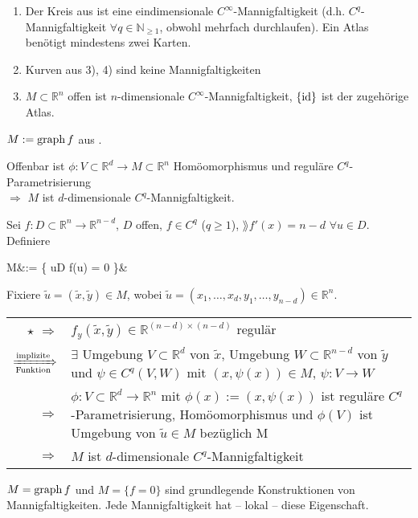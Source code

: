 \begin{example}
	\begin{enumerate}[label={\arabic*)}]
		\item Der Kreis aus  ist eine eindimensionale $C^{\infty}$-Mannigfaltigkeit (d.h. $C^q$-Mannigfaltigkeit $\forall q \in \mathbb{N}_{\ge 1}$, obwohl mehrfach durchlaufen). Ein Atlas benötigt mindestens zwei Karten.
		\item Kurven aus  3), 4) sind keine Mannigfaltigkeiten
		\item $M\subset \mathbb{R}^n$ offen ist $n$-dimensionale $C^\infty$-Mannigfaltigkeit, $\{ \operatorname{id} \}$ ist der zugehörige Atlas.
	\end{enumerate}
\end{example}

\begin{example}
	$M:= \operatorname{graph} f$ aus .
	
	Offenbar ist $\phi\!: V\subset \mathbb{R}^d\to M\subset \mathbb{R}^n$ Homöomorphismus und reguläre $C^q$-Parametrisierung\\
	 $\Rightarrow$ $M$ ist $d$-dimensionale $C^q$-Mannigfaltigkeit.
\end{example}

\begin{example}
	Sei $f\!:D\subset \mathbb{R}^n\to \mathbb{R}^{n-d}$, $D$ offen, $f\in C^q$ ($q\ge 1$), $\rang f'(x) = n-d$ $\forall u\in D$. Definiere \begin{flalign} \tag{\star} M&:= \{ u\in D \mid f(u) = 0 \}&\end{flalign}
	
	Fixiere $\tilde{u} = (\tilde{x}, \tilde{y})\in M$, wobei $\tilde{u	} = (x_1, \dotsc, x_d, y_1, \dotsc, y_{n-d})\in \mathbb{R}^n$.
	
	\begin{tabularx}{\linewidth}{r@{\ }X}
		$\star$ $\Rightarrow$ & $f_y(\tilde{x}, \tilde{y})\in \mathbb{R}^{(n-d)\times(n-d)}$ regulär \\
		$\xRightarrow[\text{Funktion}]{\text{implizite}}$ & $\exists$ Umgebung $V\subset \mathbb{R}^d$ von $\tilde{x}$, Umgebung $W\subset \mathbb{R}^{n-d}$ von $\tilde{y}$ und $\psi \in C^q(V,W)$ mit $(x, \psi(x))\in M$, $\psi: V\to W$ \\
		$\Rightarrow$ & $\phi: V\subset \mathbb{R}^d \to \mathbb{R}^n$ mit $\phi(x) := (x, \psi(x))$ ist reguläre $C^q$-Parametrisierung, Homöomorphismus und $\phi(V)$ ist Umgebung von $\tilde{u} \in M$ bezüglich M \\
		$\Rightarrow$ & $M$ ist $d$-dimensionale $C^q$-Mannigfaltigkeit
	\end{tabularx}
\end{example}
\begin{underlinedenvironment}[Bemerkung]
	$M = \operatorname{graph} f$ und $M=\{f=0\}$ sind grundlegende Konstruktionen von Mannigfaltigkeiten. Jede Mannigfaltigkeit hat -- lokal -- diese Eigenschaft.
\end{underlinedenvironment}

